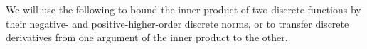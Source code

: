 



We will use the following  to bound the inner product of two discrete functions by their negative- and positive-higher-order discrete norms, or to transfer discrete derivatives from one argument of the inner product to the other.

